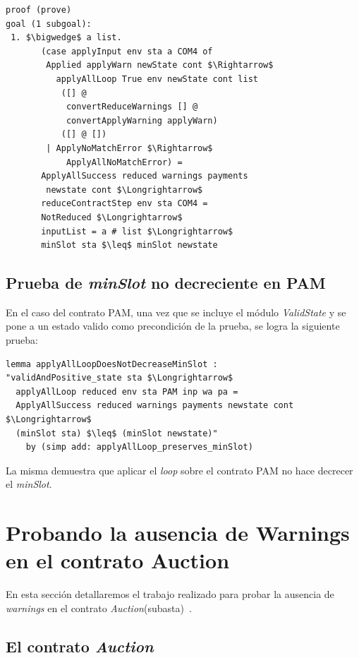 \documentclass[12pt]{book}
\begin{document}
\begin{lstlisting}[style=Isabelle]
proof (prove)
goal (1 subgoal):
 1. $\bigwedge$ a list.
       (case applyInput env sta a COM4 of
        Applied applyWarn newState cont $\Rightarrow$
          applyAllLoop True env newState cont list
           ([] @
            convertReduceWarnings [] @
            convertApplyWarning applyWarn)
           ([] @ [])
        | ApplyNoMatchError $\Rightarrow$
            ApplyAllNoMatchError) =
       ApplyAllSuccess reduced warnings payments
        newstate cont $\Longrightarrow$
       reduceContractStep env sta COM4 =
       NotReduced $\Longrightarrow$
       inputList = a # list $\Longrightarrow$
       minSlot sta $\leq$ minSlot newstate
\end{lstlisting}

\subsection{Prueba de \textit{minSlot} no decreciente en PAM}

En el caso del contrato PAM, una vez que se incluye el módulo \textit{ValidState} y se pone a un estado valido como precondición de la prueba, se logra la siguiente prueba:

\begin{lstlisting}[style=Isabelle, caption=Prueba del lema de \textit{minSlot} para el contrato PAM]
lemma applyAllLoopDoesNotDecreaseMinSlot :
"validAndPositive_state sta $\Longrightarrow$
  applyAllLoop reduced env sta PAM inp wa pa = 
  ApplyAllSuccess reduced warnings payments newstate cont $\Longrightarrow$
  (minSlot sta) $\leq$ (minSlot newstate)"
    by (simp add: applyAllLoop_preserves_minSlot)
\end{lstlisting}

La misma demuestra que aplicar el \textit{loop} sobre el contrato PAM no hace decrecer el \textit{minSlot}.

\section{Probando la ausencia de Warnings en el contrato Auction}

En esta sección detallaremos el trabajo realizado para probar la ausencia de \textit{warnings} en el contrato \textit{Auction}(subasta)~\cite{auction_haskell}.


\subsection{El contrato \textit{Auction}}
\end{document}
